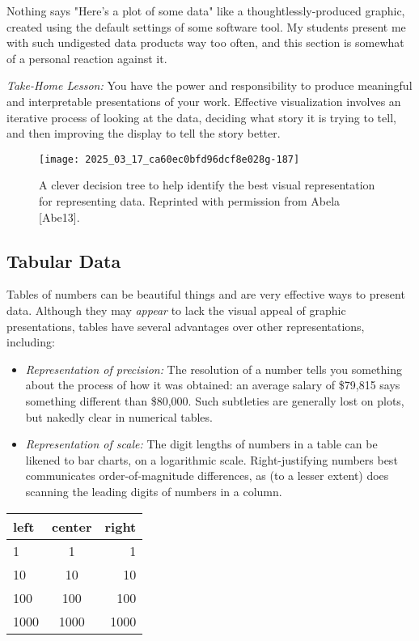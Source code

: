\documentclass[10pt]{article}
\begin{document}
Nothing says "Here's a plot of some data" like a thoughtlessly-produced graphic, created using the default settings of some software tool. My students present me with such undigested data products way too often, and this section is somewhat of a personal reaction against it.

\emph{Take-Home Lesson:} You have the power and responsibility to produce meaningful and interpretable presentations of your work. Effective visualization involves an iterative process of looking at the data, deciding what story it is trying to tell, and then improving the display to tell the story better.

\begin{figure}[h]
    \centering
    \texttt{[image: 2025\_03\_17\_ca60ec0bfd96dcf8e028g-187]}
    \caption{A clever decision tree to help identify the best visual representation for representing data. Reprinted with permission from Abela [Abe13].}
\end{figure}

\subsection{Tabular Data}
Tables of numbers can be beautiful things and are very effective ways to present data. Although they may \emph{appear} to lack the visual appeal of graphic presentations, tables have several advantages over other representations, including:

\begin{itemize}
  \item \emph{Representation of precision:} The resolution of a number tells you something about the process of how it was obtained: an average salary of \$79,815 says something different than \$80,000. Such subtleties are generally lost on plots, but nakedly clear in numerical tables.
  \item \emph{Representation of scale:} The digit lengths of numbers in a table can be likened to bar charts, on a logarithmic scale. Right-justifying numbers best communicates order-of-magnitude differences, as (to a lesser extent) does scanning the leading digits of numbers in a column.
\end{itemize}

\begin{center}
\begin{tabular}{lcr}
left & center & right \\
\hline
1 & 1 & 1 \\
10 & 10 & 10 \\
100 & 100 & 100 \\
1000 & 1000 & 1000 \\
\hline
\end{tabular}
\end{center}
\end{document}
